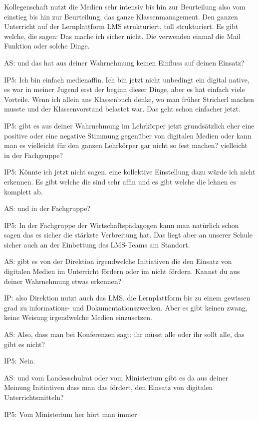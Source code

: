 \documentclass[fontsize=11pt,paper=a4]{scrbook}
\begin{document}
{\begin{itemize*}
Kollegenschaft nutzt die Medien sehr
intensiv bis hin zur Beurteilung also
vom einstieg bis hin zur Beurteilung, das
ganze Klassenmanagement. Den ganzen Unterricht auf der Lernplattform LMS 
strukturiert, toll strukturiert. Es gibt welche, die sagen: Das mache ich sicher nicht. Die
verwenden einmal die Mail Funktion oder
solche Dinge.
\item[AS:]  und das hat aus deiner Wahrnehmung keinen Einfluss auf deinen Einsatz?
\item[IP5:] Ich bin einfach medienaffin. Ich bin jetzt nicht unbedingt ein digital
native, es war in meiner Jugend erst
der beginn dieser Dinge, aber es hat einfach viele Vorteile. Wenn ich allein ans
Klassenbuch denke, wo man früher Stricherl
machen musste und der Klassenvorstand
belastet war. Das geht schon einfacher jetzt.
\item[IP5:] gibt es
aus deiner Wahrnehmung im Lehrkörper
jetzt grundsätzlich eher eine positive oder eine
negative Stimmung gegenüber von 
digitalen Medien oder kann man es
vielleicht für den ganzen Lehrkörper gar nicht
so fest machen? vielleicht in der
Fachgruppe? 
\item[IP5:] Könnte ich jetzt nicht sagen. eine kollektive
Einstellung dazu würde ich nicht
erkennen. Es gibt welche die sind sehr
affin und es gibt welche die lehnen es komplett
ab.
\item[AS:] und in der Fachgruppe?
\item[IP5:] In der Fachgruppe der Wirtschaftspädagogen
kann man natürlich schon sagen das es
sicher die stärkste Verbreitung hat. Das liegt aber an unserer Schule sicher auch an der Einbettung des LMS-Teams am Standort.
\item[AS:] gibt es
von der Direktion irgendwelche
Initiativen die den Einsatz von digitalen
Medien im Unterricht fördern oder im
nicht fördern. Kannst du aus deiner
Wahrnehmung etwas erkennen?
\item[IP:] also Direktion nutzt
auch das LMS, die Lernplattform bis
zu einem gewissen grad zu informations- und 
Dokumentationszwecken. Aber es gibt
keinen zwang, keine Weisung irgendwelche
Medien einzusetzen.
\item[AS:] Also, dass man bei Konferenzen sagt: ihr
müsst alle oder ihr sollt alle, das gibt es nicht?
\item[IP5:] Nein.
\item[AS:] und vom Landesschulrat oder vom
Ministerium gibt es da aus deiner
Meinung Initiativen dass man das fördert, den Einsatz von digitalen Unterrichtsmitteln?
\item[IP5:] Vom Ministerium her hört man immer

\end{itemize*}}
\end{document}
